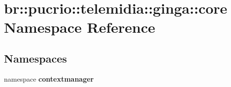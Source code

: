 \section{br::pucrio::telemidia::ginga::core Namespace Reference}
\label{namespacebr_1_1pucrio_1_1telemidia_1_1ginga_1_1core}


\subsection*{Namespaces}
\begin{CompactItemize}
\item 
namespace {\bf contextmanager}
\end{CompactItemize}
